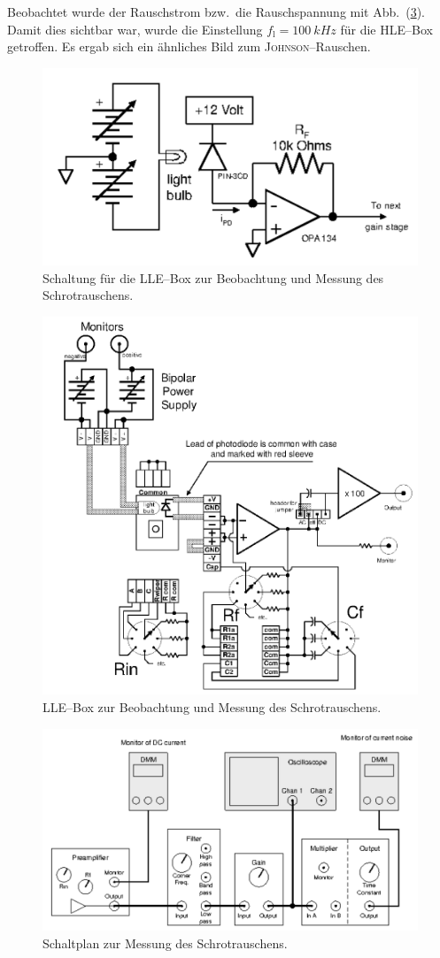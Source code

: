 \documentclass[sn-mathphys-num,iicol]{sn-jnl}
\theoremstyle{thmstyleone}
\theoremstyle{thmstyletwo}
\theoremstyle{thmstylethree}
\begin{document}
Beobachtet wurde der Rauschstrom bzw.\ die Rauschspannung mit Abb.\ (\ref{fig:schaltplan_schrot_mess}).
Damit dies sichtbar war, wurde die Einstellung $f_\text{l}=\SI{100}{kHz}$ für die HLE--Box getroffen.
Es ergab sich ein ähnliches Bild zum \textsc{Johnson}--Rauschen. %

\begin{figure}[t]
	\centering
	\includegraphics[width=.5\textwidth]{425_schaltplan_visualisierung_schort_LLE.png}
	\caption{Schaltung für die LLE--Box zur Beobachtung und Messung des Schrotrauschens.\cite{anleitung425}} \label{fig:schrot_lle_beob}
\end{figure}
\begin{figure}[t]
	\centering
	\includegraphics[width=.5\textwidth]{425_schaltplan_messung_schrot_LLE.png}
	\caption{LLE--Box zur Beobachtung und Messung des Schrotrauschens.\cite{anleitung425}} \label{fig:schrot_lle_mess}
\end{figure}
\begin{figure}[t]
	\centering
	\includegraphics[width=.5\textwidth]{425_schaltplan_messung_schrot.png}
	\caption{Schaltplan zur Messung des Schrotrauschens.\cite{anleitung425}} \label{fig:schaltplan_schrot_mess}
\end{figure}
\end{document}
